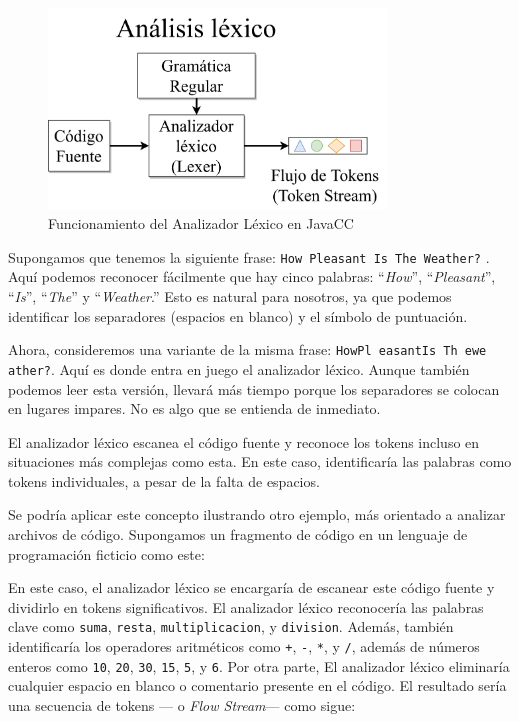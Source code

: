 

\begin{figure}[H]
	\centering
	\includegraphics[width=0.8\textwidth]{imagenes/analizadorlexico.png}
	\caption{Funcionamiento del Analizador Léxico en JavaCC\cite{ytanalizadorlexico}}
	\label{fig:analizadorlexico}
\end{figure}

Supongamos que tenemos la siguiente frase: \lstinline|How Pleasant Is The Weather?| . Aquí podemos reconocer fácilmente que hay cinco palabras: “\textit{How}”, “\textit{Pleasant}”, “\textit{Is}”, “\textit{The}” y “\textit{Weather}.” Esto es natural para nosotros, ya que podemos identificar los separadores (espacios en blanco) y el símbolo de puntuación.

Ahora, consideremos una variante de la misma frase: \lstinline|HowPl easantIs Th ewe ather?|. Aquí es donde entra en juego el analizador léxico. Aunque también podemos leer esta versión, llevará más tiempo porque los separadores se colocan en lugares impares. No es algo que se entienda de inmediato.

El analizador léxico escanea el código fuente y reconoce los tokens incluso en situaciones más complejas como esta. En este caso, identificaría las palabras como tokens individuales, a pesar de la falta de espacios.

Se podría aplicar este concepto ilustrando otro ejemplo, más orientado a analizar archivos de código. Supongamos un fragmento de código en un lenguaje de programación ficticio como este:

\lstset{inputencoding=utf8/latin1}


En este caso, el analizador léxico se encargaría de escanear este código fuente y dividirlo en tokens significativos. El analizador léxico reconocería las palabras clave como \lstinline|suma|, \lstinline|resta|, \lstinline|multiplicacion|, y \lstinline|division|. Además, también identificaría los operadores aritméticos como \lstinline|+|, \lstinline|-|,  \lstinline|*|, y  \lstinline|/|, además de números enteros como  \lstinline|10|,  \lstinline|20|,  \lstinline|30|,  \lstinline|15|,  \lstinline|5|, y \lstinline|6|. Por otra parte, El analizador léxico eliminaría cualquier espacio en blanco o comentario presente en el código. El resultado sería una secuencia de tokens --- o \textit{Flow Stream}--- como sigue:

